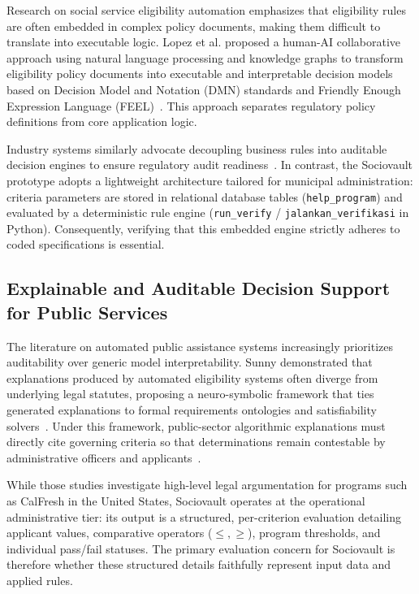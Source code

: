 \documentclass[runningheads]{llncs}
\begin{document}
Research on social service eligibility automation emphasizes that eligibility rules are often embedded in complex policy documents, making them difficult to translate into executable logic. Lopez et al. proposed a human-AI collaborative approach using natural language processing and knowledge graphs to transform eligibility policy documents into executable and interpretable decision models based on Decision Model and Notation (DMN) standards and Friendly Enough Expression Language (FEEL)~\cite{lopez2022envisioning}. This approach separates regulatory policy definitions from core application logic. 

Industry systems similarly advocate decoupling business rules into auditable decision engines to ensure regulatory audit readiness~\cite{progress_software}. In contrast, the Sociovault prototype adopts a lightweight architecture tailored for municipal administration: criteria parameters are stored in relational database tables (\texttt{help\_program}) and evaluated by a deterministic rule engine (\texttt{run\_verify} / \texttt{jalankan\_verifikasi} in Python). Consequently, verifying that this embedded engine strictly adheres to coded specifications is essential.

\subsection{Explainable and Auditable Decision Support for Public Services}

The literature on automated public assistance systems increasingly prioritizes auditability over generic model interpretability. Sunny demonstrated that explanations produced by automated eligibility systems often diverge from underlying legal statutes, proposing a neuro-symbolic framework that ties generated explanations to formal requirements ontologies and satisfiability solvers~\cite{sunny2025neuro}. Under this framework, public-sector algorithmic explanations must directly cite governing criteria so that determinations remain contestable by administrative officers and applicants~\cite{sunny2025neuro}.

While those studies investigate high-level legal argumentation for programs such as CalFresh in the United States, Sociovault operates at the operational administrative tier: its output is a structured, per-criterion evaluation detailing applicant values, comparative operators ($\le, \ge$), program thresholds, and individual pass/fail statuses. The primary evaluation concern for Sociovault is therefore whether these structured details faithfully represent input data and applied rules.
\end{document}
